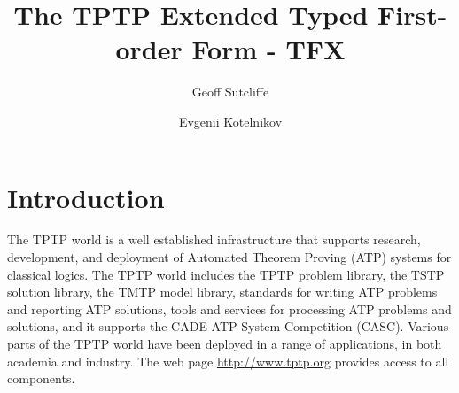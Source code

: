 \documentclass{easychair}
\begin{document}
\title{The TPTP Extended Typed First-order Form - TFX}
\author{
    Geoff Sutcliffe
\and
    Evgenii Kotelnikov
}
\clearpage
\maketitle

\begin{abstract}
\end{abstract}

\newcommand{\binding}[2]{{#1}={#2}}
\newcommand{\ite}[3]{\mathtt{if}\;{#1}\;\allowbreak\mathtt{then}\;{#2}\;\allowbreak\mathtt{else}\;{#3}}
\newcommand{\letin}[3]{\mathtt{let}\;\binding{#1}{#2}\;\allowbreak\mathtt{in}\;{#3}}
\newcommand{\letinpar}[5]{\mathtt{let}\;\binding{#1}{#2};\;\binding{#3}{#4}\;\mathtt{in}\;{#5}}
\newcommand{\letindef}[2]{\mathtt{let}\;{#1}\;\allowbreak\mathtt{in}\;{#2}}
\newcommand{\letnl}[3]{\begin{aligned}[t]\mathtt{let}\;&\binding{#1}{#2}\\[-0.2em]\mathtt{in}\;&{#3}\end{aligned}}
\newcommand{\letinnl}[3]{\begin{aligned}[t]&\mathtt{let}\;\binding{#1}{#2}\;\mathtt{in}\\[-0.2em]&\quad{#3}\end{aligned}}
\newcommand{\itenll}[3]{\begin{aligned}[t]&\mathtt{if}\;{#1}\\[-0.2em]&\mathtt{then}\;{#2}\\[-0.2em]&\mathtt{else}\;{#3}\end{aligned}}
\newcommand{\tuple}[1]{({#1})}

\renewcommand{\implies}{\Rightarrow}
\newcommand{\liff}{\Leftrightarrow}
\newcommand{\lniff}{\not\Leftrightarrow}
\newcommand{\eql}{\doteq}
\newcommand{\neql}{\not\doteq}
\newcommand{\bool}{\mathit{bool}}

\section{Introduction}
\label{Introduction}

The TPTP world \cite{Sut10} is a well established infrastructure that supports
research, development, and deployment of Automated Theorem Proving (ATP)
systems for classical logics.
The TPTP world includes the TPTP problem library,
the TSTP solution library,
the TMTP model library,
standards for writing ATP problems and reporting ATP solutions,
tools and services for processing ATP problems and solutions,
and it supports the CADE ATP System Competition (CASC).
Various parts of the TPTP world have been deployed in a range of applications,
in both academia and industry.
The web page \url{http://www.tptp.org} provides access to all components.
\end{document}
